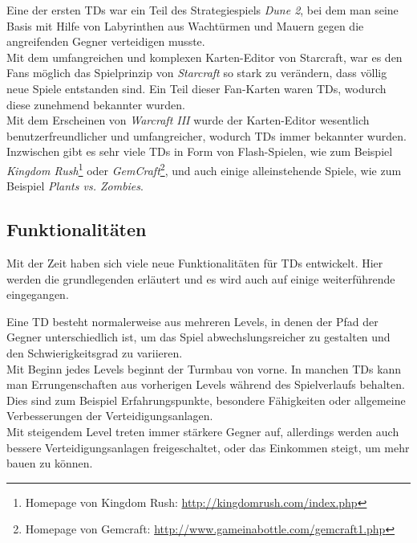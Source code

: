 Eine der ersten TDs war ein Teil des Strategiespiels \textit{Dune 2}, bei dem man seine Basis mit Hilfe von Labyrinthen aus Wachtürmen und Mauern gegen die angreifenden Gegner verteidigen musste.\\
Mit dem umfangreichen und komplexen Karten-Editor von Starcraft, war es den Fans möglich das Spielprinzip von \textit{Starcraft} so stark zu verändern, dass völlig neue Spiele entstanden sind. Ein Teil dieser Fan-Karten waren TDs, wodurch diese zunehmend bekannter wurden.\\
Mit dem Erscheinen von \textit{Warcraft III} wurde der Karten-Editor wesentlich benutzerfreundlicher und umfangreicher, wodurch TDs immer bekannter wurden.\\
Inzwischen gibt es sehr viele TDs in Form von Flash-Spielen, wie zum Beispiel \textit{Kingdom Rush}\footnote{Homepage von Kingdom Rush: \url{http://kingdomrush.com/index.php}} oder \textit{GemCraft}\footnote{Homepage von Gemcraft: \url{http://www.gameinabottle.com/gemcraft1.php}}, und auch einige alleinstehende Spiele, wie zum Beispiel \textit{Plants vs. Zombies}.

\subsection{Funktionalitäten}

Mit der Zeit haben sich viele neue Funktionalitäten für TDs entwickelt. Hier werden die grundlegenden erläutert und es wird auch auf einige weiterführende eingegangen.

Eine TD besteht normalerweise aus mehreren Levels, in denen der Pfad der Gegner unterschiedlich ist, um das Spiel abwechslungsreicher zu gestalten und den Schwierigkeitsgrad zu variieren.\\
Mit Beginn jedes Levels beginnt der Turmbau von vorne. In manchen TDs kann man Errungenschaften aus vorherigen Levels während des Spielverlaufs behalten. Dies sind zum Beispiel Erfahrungspunkte, besondere Fähigkeiten oder allgemeine Verbesserungen der Verteidigungsanlagen.\\
Mit steigendem Level treten immer stärkere Gegner auf, allerdings werden auch bessere Verteidigungsanlagen freigeschaltet, oder das Einkommen steigt, um mehr bauen zu können.

